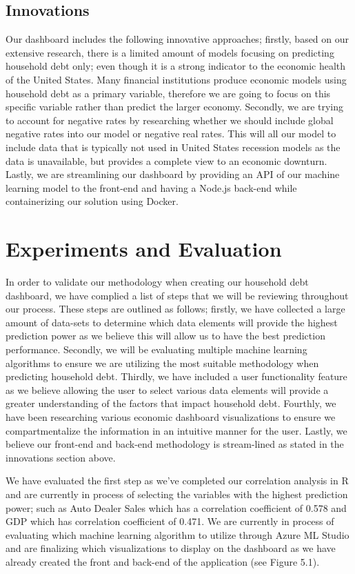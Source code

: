 \documentclass[sigconf,nonacm,11pt]{acmart}
\begin{document}
\subsection{Innovations}

Our dashboard includes the following innovative approaches; firstly, based on our extensive research, there is a limited amount of models focusing on predicting household debt only; even though it is a strong indicator to the economic health of the United States. Many financial institutions produce economic models using household debt as a primary variable, therefore we are going to focus on this specific variable rather than predict the larger economy. Secondly, we are trying to account for negative rates by researching whether we should include global negative rates into our model or negative real rates. This will all our model to include data that is typically not used in United States recession models as the data is unavailable, but provides a complete view to an economic downturn. Lastly, we are streamlining our dashboard by providing an API of our machine learning model to the front-end and having a Node.js back-end while containerizing our solution using Docker.\vspace{-0.5em}

\section{Experiments and Evaluation}
In order to validate our methodology when creating our household debt dashboard, we have complied a list of steps that we will be reviewing throughout our process. These steps are outlined as follows; firstly, we have collected a large amount of data-sets to determine which data elements will provide the highest prediction power as we believe this will allow us to have the best prediction performance. Secondly, we will be evaluating multiple machine learning algorithms to ensure we are utilizing the most suitable methodology when predicting household debt. Thirdly, we have included a user functionality feature as we believe allowing the user to select various data elements will provide a greater understanding of the factors that impact household debt. Fourthly, we have been researching various economic dashboard visualizations to ensure we compartmentalize the information in an intuitive manner for the user. Lastly, we believe our front-end and back-end methodology is stream-lined as stated in the innovations section above. 

We have evaluated the first step as we've completed our correlation analysis in R and are currently in process of selecting the variables with the highest prediction power; such as Auto Dealer Sales which has a correlation coefficient of 0.578 and GDP which has correlation coefficient of 0.471. We are currently in process of evaluating which machine learning algorithm to utilize through Azure ML Studio and are finalizing which visualizations to display on the dashboard as we have already created the front and back-end of the application (see Figure 5.1).
\end{document}
